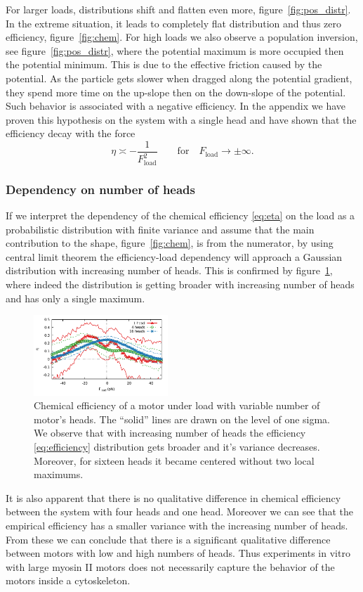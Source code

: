 \documentclass[aps,pre,twocolumn,showpacs,showkeys,superscriptaddress,floatfix]{revtex4-1}
\begin{document}
For larger loads, distributions shift and flatten even more, figure~\ref{fig:pos_distr}. 
In the extreme situation, it leads to completely flat distribution and thus zero efficiency, figure~\ref{fig:chem}.
For high loads we also observe a population inversion, see figure~\ref{fig:pos_distr}, 
where the potential maximum is more occupied then the potential minimum. 
This is due to the effective friction caused by the potential. 
As the particle gets slower when dragged along the potential gradient, 
 they spend more time on the up-slope then on the down-slope of the potential.
Such behavior is associated with a negative efficiency. 
In the appendix we have proven this hypothesis on the system with a single head and have shown that the efficiency decay with the force 
\[
\eta \asymp - \frac{1}{ F_\text{load}^2 } \qquad \text{for} \quad F_\text{load} \to \pm \infty .
\]

\subsubsection{Dependency on number of heads}
If we interpret the dependency of the chemical efficiency \eqref{eq:eta} on the load as a probabilistic distribution with finite variance and assume that the main contribution to the shape, figure~\ref{fig:chem}, is from the numerator, 
by using central limit theorem the efficiency-load dependency will approach a Gaussian distribution with increasing number of heads. 
This is confirmed by figure~\ref{fig:chem_eff_1head}, where indeed the distribution is getting broader with increasing number of heads and has only a single maximum.
\begin{figure}[t]
\centering
\includegraphics[width=0.45\textwidth,height=!]{chemical_cycle_1head}
\caption{
\label{fig:chem_eff_1head}
Chemical efficiency of a motor under load with variable number of motor's heads.
The ``solid'' lines are drawn on the level of one sigma. 
We observe that with increasing number of heads the efficiency \eqref{eq:efficiency} distribution gets broader and it's variance decreases.
Moreover, for sixteen heads it became centered without two local maximums.
}
\end{figure}
It is also apparent that there is no qualitative difference in chemical efficiency between the system with four heads and one head.
Moreover we can see that the empirical efficiency has a smaller variance with the increasing number of heads. 
From these we can conclude that there is a significant qualitative difference between motors with low and high numbers of heads. 
Thus experiments in vitro with large myosin II motors \cite{} does not necessarily capture the behavior of the motors inside a cytoskeleton. %
\end{document}
